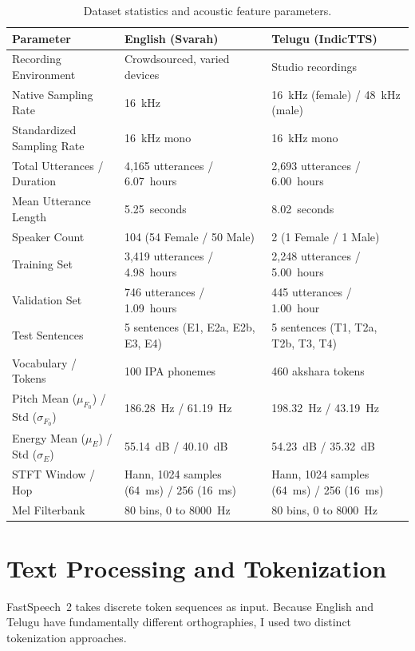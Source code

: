 \documentclass[11pt,a4paper]{report}
\begin{document}
\begin{table}[!htbp]
\centering
\caption{Dataset statistics and acoustic feature parameters.}
\label{tab:dataset_stats}
\small
\begin{tabularx}{\textwidth}{lXX}
\toprule
\textbf{Parameter} & \textbf{English (Svarah)} & \textbf{Telugu (IndicTTS)} \\
\midrule
Recording Environment & Crowdsourced, varied devices & Studio recordings \\
Native Sampling Rate & 16~kHz & 16~kHz (female) / 48~kHz (male) \\
Standardized Sampling Rate & 16~kHz mono & 16~kHz mono \\
Total Utterances / Duration & 4{,}165 utterances / 6.07~hours & 2{,}693 utterances / 6.00~hours \\
Mean Utterance Length & 5.25~seconds & 8.02~seconds \\
Speaker Count & 104 (54 Female / 50 Male) & 2 (1 Female / 1 Male) \\
\midrule
Training Set & 3{,}419 utterances / 4.98~hours & 2{,}248 utterances / 5.00~hours \\
Validation Set & 746 utterances / 1.09~hours & 445 utterances / 1.00~hour \\
Test Sentences & 5 sentences (E1, E2a, E2b, E3, E4) & 5 sentences (T1, T2a, T2b, T3, T4) \\
\midrule
Vocabulary / Tokens & 100 IPA phonemes & 460 akshara tokens \\
Pitch Mean ($\mu_{F_0}$) / Std ($\sigma_{F_0}$) & 186.28~Hz / 61.19~Hz & 198.32~Hz / 43.19~Hz \\
Energy Mean ($\mu_E$) / Std ($\sigma_E$) & 55.14~dB / 40.10~dB & 54.23~dB / 35.32~dB \\
STFT Window / Hop & Hann, 1024 samples (64~ms) / 256 (16~ms) & Hann, 1024 samples (64~ms) / 256 (16~ms) \\
Mel Filterbank & 80 bins, 0 to 8000~Hz & 80 bins, 0 to 8000~Hz \\
\bottomrule
\end{tabularx}
\end{table}

\FloatBarrier
\vspace{1.5em}

\section{Text Processing and Tokenization}
FastSpeech~2 takes discrete token sequences as input. Because English and Telugu have fundamentally different orthographies, I used two distinct tokenization approaches.
\end{document}

